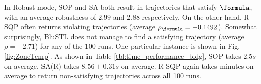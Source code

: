 In Robust mode, SOP and SA both result in trajectories that satisfy $\formula$, with an average robustness of $2.99$ and $2.88$ respectively. On the other hand, R-SQP often returns violating trajectories (average $\rob_{\formula} = -0.1492$). 
Somewhat surprisingly, BluSTL does not manage to find a satisfying trajectory (average $\rho=-2.71$) for any of the 100 runs. 
One particular instance is shown in Fig. \ref{fig:ZoneTemp}. 
As shown in Table \ref{tbl:time_performance_bldg}, SOP takes $2.5s$ on average.
SA(R) takes $8.56 \pm 0.31s$ on average. 
R-SQP again takes minutes on average to return non-satisfying trajectories across all 100 runs. 



